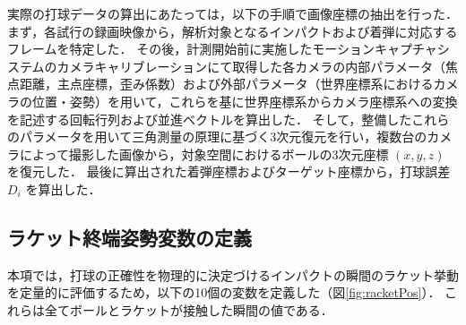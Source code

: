 \documentclass[../main]{subfiles}
\begin{document}
実際の打球データの算出にあたっては，以下の手順で画像座標の抽出を行った．
まず，各試行の録画映像から，解析対象となるインパクトおよび着弾に対応するフレームを特定した．
その後，計測開始前に実施したモーションキャプチャシステムのカメラキャリブレーションにて取得した各カメラの内部パラメータ（焦点距離，主点座標，歪み係数）および外部パラメータ（世界座標系におけるカメラの位置・姿勢）を用いて，これらを基に世界座標系からカメラ座標系への変換を記述する回転行列および並進ベクトルを算出した．
そして，整備したこれらのパラメータを用いて三角測量の原理に基づく3次元復元を行い，複数台のカメラによって撮影した画像から，対象空間におけるボールの3次元座標 $(x, y, z)$ を復元した．
最後に算出された着弾座標およびターゲット座標から，打球誤差 $D_i$ を算出した．

\subsection{ラケット終端姿勢変数の定義}
\label{subsec:racket_vars}
本項では，打球の正確性を物理的に決定づけるインパクトの瞬間のラケット挙動を定量的に評価するため，以下の10個の変数を定義した（図\ref{fig:racketPos}）．
これらは全てボールとラケットが接触した瞬間の値である．
\end{document}
